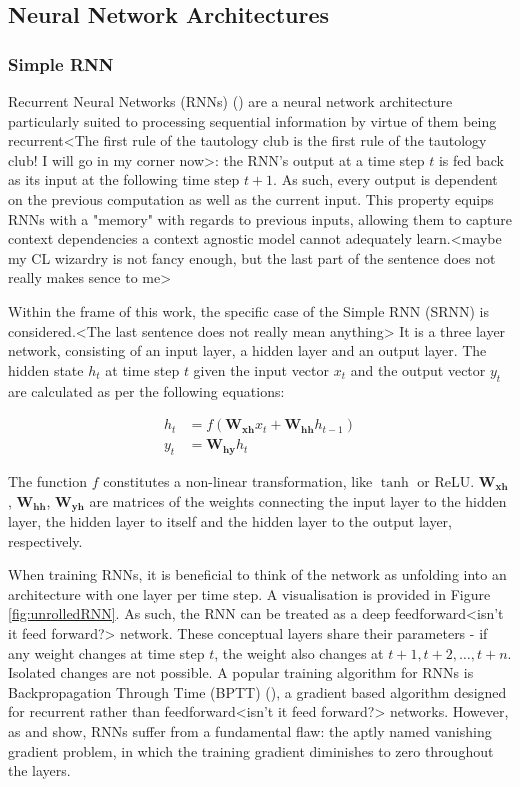 \subsection{Neural Network Architectures}\label{neuralNetworkArchitectures}

\subsubsection{Simple RNN}\label{SRNN}
Recurrent Neural Networks (RNNs) (\cite{Elman1990}) are a neural network architecture particularly suited to processing sequential information by virtue of them being recurrent<The first rule of the tautology club is the first rule of the tautology club! I will go in my corner now>: the RNN's output at a time step $t$ is fed back as its input at the following time step $t+1$. As such, every output is dependent on the previous computation as well as the current input. This property equips RNNs with a "memory" with regards to previous inputs, allowing them to capture context dependencies a context agnostic model cannot adequately learn.<maybe my CL wizardry is not fancy enough, but the last part of the sentence does not really makes sence to me>

Within the frame of this work, the specific case of the Simple RNN (SRNN) is considered.<The last sentence does not really mean anything> It is a three layer network, consisting of an input layer, a hidden layer and an output layer. The hidden state $h_t$ at time step $t$ given the input vector $x_t$ and the output vector $y_t$ are calculated as per the following equations:

\begin{align}
	h_{t} &= f(\boldsymbol{W_{xh}} x_{t} + \boldsymbol{W_{hh}} h_{t-1}) \\
	y_{t} &= \boldsymbol{W_{hy}} h_{t}
\end{align}

The function $f$ constitutes a non-linear transformation, like $\tanh$ or ReLU. $\boldsymbol{W_{xh}}$, $\boldsymbol{W_{hh}}$, $\boldsymbol{W_{yh}}$ are matrices of the weights connecting the input layer to the hidden layer, the hidden layer to itself and the hidden layer to the output layer, respectively.

When training RNNs, it is beneficial to think of the network as unfolding into an architecture with one layer per time step. A visualisation is provided in Figure \ref{fig:unrolledRNN}. As such, the RNN can be treated as a deep feedforward<isn't it feed forward?> network. These conceptual layers share their parameters - if any weight changes at time step $t$, the weight also changes at $t+1, t+2, \dots, t+n$. Isolated changes are not possible. A popular training algorithm for RNNs is Backpropagation Through Time (BPTT) (\cite{Williams1998}), a gradient based algorithm designed for recurrent rather than feedforward<isn't it feed forward?> networks. However, as \cite{Bengio1994} and \cite{Hochreiter1998} show, RNNs suffer from a fundamental flaw: the aptly named vanishing gradient problem, in which the training gradient diminishes to zero throughout the layers.

